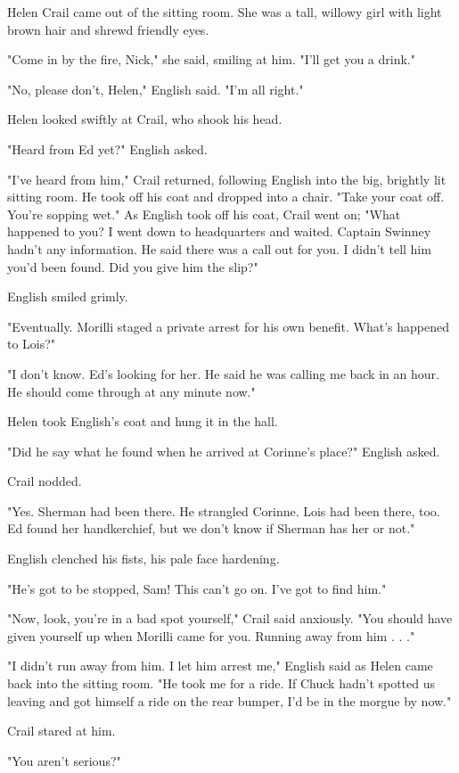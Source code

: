\documentclass{novel}
\begin{document}
Helen Crail came out of the sitting room. She was a tall, willowy girl with light brown hair and shrewd friendly eyes.

"Come in by the fire, Nick," she said, smiling at him. "I'll get you a drink."

"No, please don't, Helen," English said. "I'm all right."

Helen looked swiftly at Crail, who shook his head.

"Heard from Ed yet?" English asked.

"I've heard from him," Crail returned, following English into the big, brightly lit sitting room. He took off his coat and dropped into a chair. "Take your coat off. You're sopping wet." As English took off his coat, Crail went on; "What happened to you? I went down to headquarters and waited. Captain Swinney hadn't any information. He said there was a call out for you. I didn't tell him you'd been found. Did you give him the slip?"

English smiled grimly.

"Eventually. Morilli staged a private arrest for his own benefit. What's happened to Lois?"

"I don't know. Ed's looking for her. He said he was calling me back in an hour. He should come through at any minute now."

Helen took English's coat and hung it in the hall.

"Did he say what he found when he arrived at Corinne's place?" English asked.

Crail nodded.

"Yes. Sherman had been there. He strangled Corinne. Lois had been there, too. Ed found her handkerchief, but we don't know if Sherman has her or not."

English clenched his fists, his pale face hardening.

"He's got to be stopped, Sam! This can't go on. I've got to find him."

"Now, look, you're in a bad spot yourself," Crail said anxiously. "You should have given yourself up when Morilli came for you. Running away from him . . ."

"I didn't run away from him. I let him arrest me," English said as Helen came back into the sitting room. "He took me for a ride. If Chuck hadn't spotted us leaving and got himself a ride on the rear bumper, I'd be in the morgue by now."

Crail stared at him.

"You aren't serious?"
\end{document}
